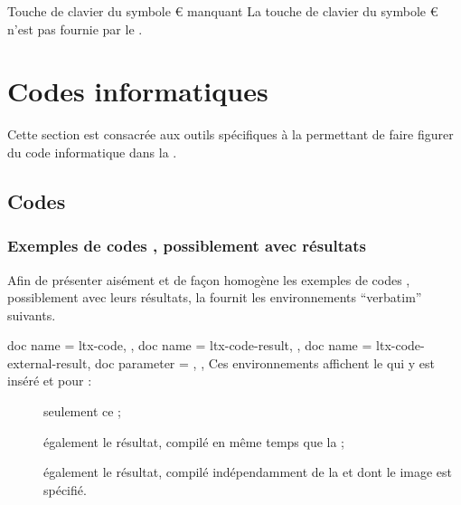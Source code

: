 \documentclass{letgut}
\begin{document}
\begin{dbwarning}{Touche de clavier du symbole € manquant}{}
  La touche de clavier du symbole € n'est pas fournie par le
  .
\end{dbwarning}

\section{Codes informatiques}
\label{sec:code-informatique}

Cette section est consacrée aux outils spécifiques à la  permettant
de faire figurer du code informatique dans la .

\subsection{Codes }
\label{sec:exemples-de-codes}

\subsubsection{Exemples de codes , possiblement avec résultats}
\label{sec:listings-}

Afin de présenter aisément et de façon homogène les exemples de codes
, possiblement avec leurs résultats, la  fournit les
environnements \enquote{verbatim} suivants.

\begin{docEnvironments}[
  doc parameter = \oarg{options},
  doclang/environment content = code,
  ]{
    {
      doc name = ltx-code,
    },
    {
      doc name = ltx-code-result,
    },
    {
      doc name = ltx-code-external-result,
      doc parameter = ,
    },
  }
  Ces environnements affichent le   qui y est inséré et
  pour :
  \begin{description}
  \item[] seulement ce  ;
  \item[] également le résultat, compilé en même temps
    que la  ;
  \item[] également le résultat, compilé
    indépendamment de la  et dont le  image est spécifié.
  \end{description}
\end{docEnvironments}
\end{document}
